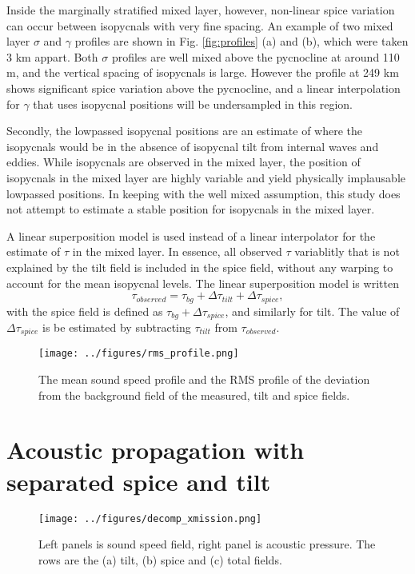 \documentclass[preprint]{JASA}
\begin{document}
 Inside the marginally stratified mixed layer, however, non-linear spice variation can occur between isopycnals with very fine spacing. An example of two mixed layer $\sigma$ and $\gamma$ profiles are shown in Fig. \ref{fig:profiles} (a) and (b), which were taken 3 km appart. Both $\sigma$ profiles are well mixed above the pycnocline at around 110 m, and the vertical spacing of isopycnals is large. However the profile at 249 km shows significant spice variation above the pycnocline, and a linear interpolation for $\gamma$ that uses isopycnal positions will be undersampled in this region.

Secondly, the lowpassed isopycnal positions are an estimate of where the isopycnals would be in the absence of isopycnal tilt from internal waves and eddies. While isopycnals are observed in the mixed layer, the position of isopycnals in the mixed layer are highly variable and yield physically implausable lowpassed positions. In keeping with the well mixed assumption, this study does not attempt to estimate a stable position for isopycnals in the mixed layer.

A linear superposition model is used instead of a linear interpolator for the estimate of $\tau$ in the mixed layer. In essence, all observed $\tau$ variablitly that is not explained by the tilt field is included in the spice field, without any warping to account for the mean isopycnal levels. The linear superposition model is written
\begin{equation}
    \tau_{observed} = \tau_{bg} + \Delta \tau_{tilt} + \Delta \tau_{spice},
\end{equation}
with the spice field is defined as $\tau_{bg} + \Delta \tau_{spice}$, and similarly for tilt. The value of $\Delta \tau_{spice}$ is be estimated by subtracting $\tau_{tilt}$ from $\tau_{observed}$.

\begin{figure}
\texttt{[image: ../figures/rms\_profile.png]}
    \caption{\label{fig:c_rms}{The mean sound speed profile and the RMS profile of the deviation from the background field of the measured, tilt and spice fields. }}
\end{figure}

\section{\label{sec:propagation}Acoustic propagation with separated spice and tilt}
\begin{figure}
\texttt{[image: ../figures/decomp\_xmission.png]}
    \caption{\label{fig:decomp_x}{Left panels is sound speed field, right panel is acoustic pressure. The rows are the (a) tilt, (b) spice and (c) total fields.}}
\end{figure}




\end{document}
